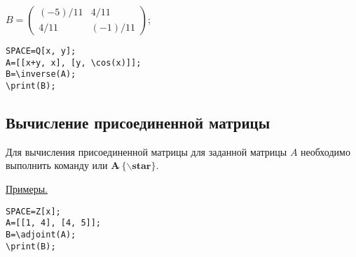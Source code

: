 {$B =\left(\begin{array}{cc}(-5)/11 &4/11\\ 4/11 & (-1)/11 \end{array}\right);$}

\begin{verbatim}
SPACE=Q[x, y]; 
A=[[x+y, x], [y, \cos(x)]];
B=\inverse(A); 
\print(B);
\end{verbatim}

 
\subsection{Вычисление присоединенной матрицы}
Для вычисления присоединенной матрицы для заданной матрицы $A$ необходимо выполнить команду  
или  $\mathbf{A\widehat{\ }\{\backslash star\}}$. 

\underline{Примеры. }

\vspace*{-2mm}
\begin{verbatim}
SPACE=Z[x]; 
A=[[1, 4], [4, 5]];
B=\adjoint(A);  
\print(B);
\end{verbatim}

